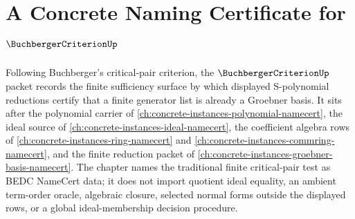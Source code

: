 \chapter{A Concrete Naming Certificate for $\BuchbergerCriterionUp$}
\label{ch:concrete-instances-buchberger-criterion-namecert}

Following Buchberger's critical-pair criterion, the $\BuchbergerCriterionUp$ packet records the finite sufficiency surface by which displayed S-polynomial reductions certify that a finite generator list is already a Groebner basis. It sits after the polynomial carrier of \autoref{ch:concrete-instances-polynomial-namecert}, the ideal source of \autoref{ch:concrete-instances-ideal-namecert}, the coefficient algebra rows of \autoref{ch:concrete-instances-ring-namecert} and \autoref{ch:concrete-instances-commring-namecert}, and the finite reduction packet of \autoref{ch:concrete-instances-groebner-basis-namecert}. The chapter names the traditional finite critical-pair test as BEDC NameCert data; it does not import quotient ideal equality, an ambient term-order oracle, algebraic closure, selected normal forms outside the displayed rows, or a global ideal-membership decision procedure.

